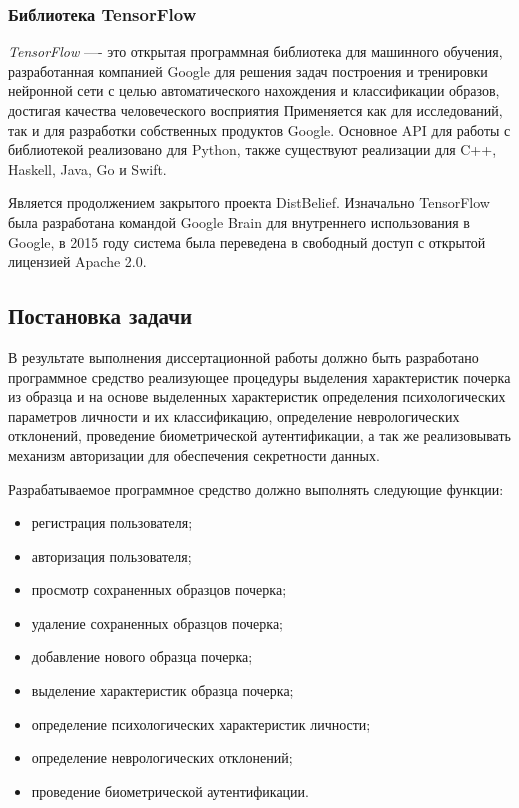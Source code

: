 \subsubsection{Библиотека TensorFlow}
\label{sec:techs:tensor_flow}
\emph{TensorFlow} —- это открытая программная библиотека для машинного обучения, разработанная компанией Google для решения задач построения и тренировки нейронной сети с целью автоматического нахождения и классификации образов, достигая качества человеческого восприятия Применяется как для исследований, так и для разработки собственных продуктов Google. Основное API для работы с библиотекой реализовано для Python, также существуют реализации для C++, Haskell, Java, Go и Swift.

Является продолжением закрытого проекта DistBelief. Изначально TensorFlow была разработана командой Google Brain для внутреннего использования в Google, в 2015 году система была переведена в свободный доступ с открытой лицензией Apache 2.0.

\subsection{Постановка задачи}
\label{sec:domain:requirements}
В результате выполнения диссертационной работы должно быть разработано программное средство реализующее процедуры выделения характеристик почерка из образца и на основе выделенных характеристик определения психологических параметров личности и их классификацию, определение неврологических отклонений, проведение биометрической аутентификации, а так же реализовывать механизм авторизации для обеспечения секретности данных.

Разрабатываемое программное средство должно выполнять следующие функции:
\begin{itemize}
  \item регистрация пользователя;
  \item авторизация пользователя;
  \item просмотр сохраненных образцов почерка;
  \item удаление сохраненных образцов почерка;
  \item добавление нового образца почерка;
  \item выделение характеристик образца почерка;
  \item определение психологических характеристик личности;
  \item определение неврологических отклонений;
  \item проведение биометрической аутентификации.
\end{itemize}

